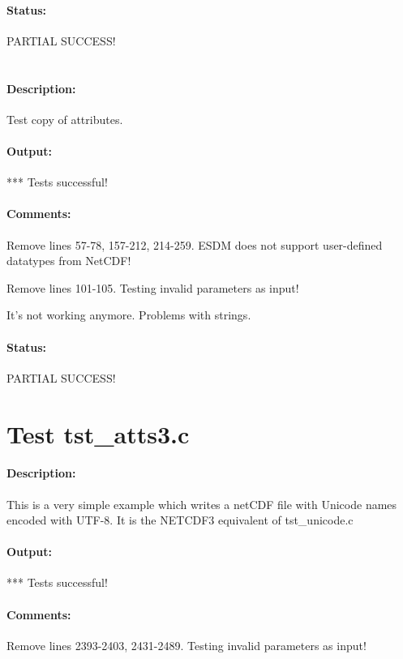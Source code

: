 \paragraph{Status:} PARTIAL SUCCESS!

\section{{\color{blue}{FIX ME! Test tst\_atts2.c}}}

\paragraph{Description:} Test copy of attributes.

\paragraph{Output:} *** Tests successful!

\paragraph{Comments:} Remove lines 57-78, 157-212, 214-259. ESDM does not support user-defined datatypes from NetCDF!

Remove lines 101-105. Testing invalid parameters as input!

It's not working anymore. Problems with strings.

\paragraph{Status:} PARTIAL SUCCESS!

\section{Test tst\_atts3.c}

\paragraph{Description:} This is a very simple example which writes a netCDF file with Unicode names encoded with UTF-8. It is the NETCDF3 equivalent of tst\_unicode.c

\paragraph{Output:} *** Tests successful!

\paragraph{Comments:} Remove lines 2393-2403, 2431-2489. Testing invalid parameters as input!

